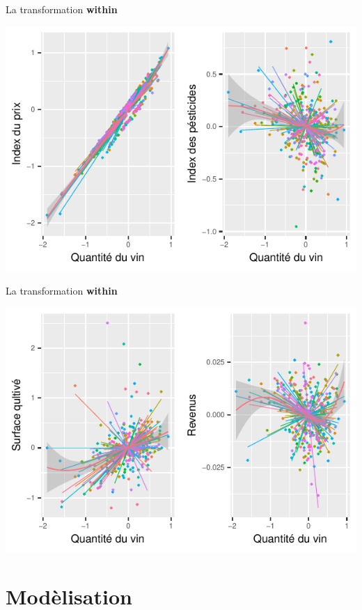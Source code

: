 \documentclass[11pt,ignorenonframetext,]{beamer}
\begin{document}
\begin{frame}{La transformation \textbf{within}}
\protect\hypertarget{la-transformation-within}{}

\includegraphics{Presentation_files/figure-beamer/unnamed-chunk-29-1.pdf}

\end{frame}

\begin{frame}{La transformation \textbf{within}}
\protect\hypertarget{la-transformation-within-1}{}

\includegraphics{Presentation_files/figure-beamer/unnamed-chunk-30-1.pdf}

\end{frame}

\hypertarget{modelisation}{%
\section{Modèlisation}\label{modelisation}}
\end{document}
